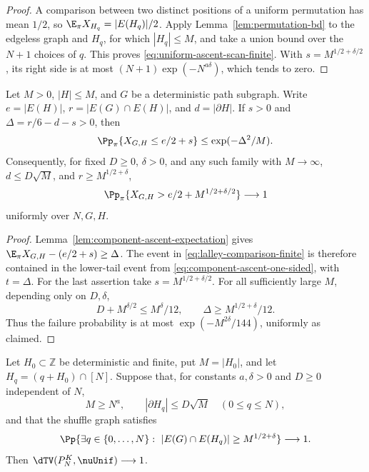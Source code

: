 \begin{proof}
A comparison between two distinct positions of a uniform permutation
has mean \(1/2\), so \(\E_\pi X_{H_q}=|E(H_q)|/2\).
Apply Lemma~\ref{lem:permutation-bd} to the edgeless graph and
\(H_q\), for which \(|H_q|\le M\), and take a union bound over
the \(N+1\) choices of \(q\).  This proves
\eqref{eq:uniform-ascent-scan-finite}.  With
\(s=M^{1/2+\delta/2}\), its right side is at most
\((N+1)\exp(-N^{a\delta})\), which tends to zero.
\end{proof}

\begin{lemma}
\label{lem:lalley-comparison}
Let \(M>0\), \(|H|\le M\), and \(G\) be a deterministic
path subgraph.  Write \(e=|E(H)|\),
\(r=|E(G)\cap E(H)|\), and \(d=|\partial H|\).
If \(s>0\) and \(\Delta=r/6-d-s>0\), then
\begin{equation}
\label{eq:lalley-comparison-finite}
  \Pp_\pi\{X_{G,H}\le e/2+s\}
  \le\exp(-\Delta^2/M).
\end{equation}
Consequently, for fixed \(D\ge0\), \(\delta>0\), and any such
family with \(M\to\infty\), \(d\le D\sqrt M\), and
\(r\ge M^{1/2+\delta}\),
\[
  \Pp_\pi\{X_{G,H}>e/2+M^{1/2+\delta/2}\}\longrightarrow1
\]
uniformly over \(N,G,H\).
\end{lemma}

\begin{proof}
Lemma~\ref{lem:component-ascent-expectation} gives
\(\E_\pi X_{G,H}-(e/2+s)\ge\Delta\).
The event in \eqref{eq:lalley-comparison-finite} is therefore
contained in the lower-tail event from
\eqref{eq:component-ascent-one-sided}, with \(t=\Delta\).
For the last assertion take \(s=M^{1/2+\delta/2}\).
For all sufficiently large \(M\), depending only on \(D,\delta\),
\[
  D+M^{\delta/2}\le M^\delta/12,
  \qquad
  \Delta\ge M^{1/2+\delta}/12.
\]
Thus the failure probability is at most
\(\exp(-M^{2\delta}/144)\), uniformly as claimed.
\end{proof}

\begin{lemma}
\label{lem:lalley}
Let \(H_0\subset\mathbb Z\) be deterministic and finite, put
\(M=|H_0|\), and let \(H_q=(q+H_0)\cap[N]\).
Suppose that, for constants \(a,\delta>0\) and \(D\ge0\)
independent of \(N\),
\[
  M\ge N^a,\qquad |\partial H_q|\le D\sqrt M
  \quad(0\le q\le N),
\]
and that the shuffle graph satisfies
\[
  \Pp\{\exists q\in\{0,\ldots,N\}:\
         |E(G)\cap E(H_q)|\ge M^{1/2+\delta}\}\longrightarrow1.
\]
Then \(\dTV(P_N^{K},\nuUnif)\longrightarrow1\).
\end{lemma}

